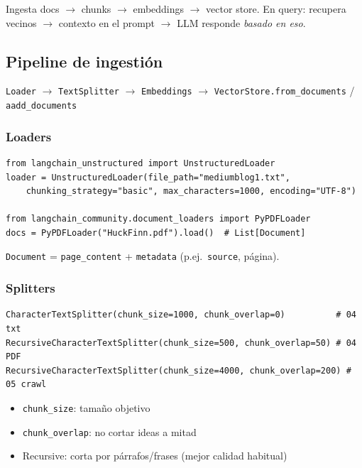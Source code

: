 \documentclass[11pt,a4paper]{article}
\begin{document}
\begin{concept}[title=Idea]
Ingesta docs $\to$ chunks $\to$ embeddings $\to$ vector store.
En query: recupera vecinos $\to$ contexto en el prompt $\to$ LLM responde \emph{basado en eso}.
\end{concept}

\subsection{Pipeline de ingestión}
\begin{center}
\texttt{Loader} $\to$ \texttt{TextSplitter} $\to$ \texttt{Embeddings} $\to$ \texttt{VectorStore.from\_documents} / \texttt{aadd\_documents}
\end{center}

\subsubsection{Loaders}
\begin{lstlisting}
from langchain_unstructured import UnstructuredLoader
loader = UnstructuredLoader(file_path="mediumblog1.txt",
    chunking_strategy="basic", max_characters=1000, encoding="UTF-8")

from langchain_community.document_loaders import PyPDFLoader
docs = PyPDFLoader("HuckFinn.pdf").load()  # List[Document]
\end{lstlisting}

\texttt{Document} = \texttt{page\_content} + \texttt{metadata} (p.ej.\ \texttt{source}, página).

\subsubsection{Splitters}
\begin{lstlisting}
CharacterTextSplitter(chunk_size=1000, chunk_overlap=0)          # 04 txt
RecursiveCharacterTextSplitter(chunk_size=500, chunk_overlap=50) # 04 PDF
RecursiveCharacterTextSplitter(chunk_size=4000, chunk_overlap=200) # 05 crawl
\end{lstlisting}

\begin{itemize}[leftmargin=*,itemsep=1pt]
  \item \texttt{chunk\_size}: tamaño objetivo
  \item \texttt{chunk\_overlap}: no cortar ideas a mitad
  \item Recursive: corta por párrafos/frases (mejor calidad habitual)
\end{itemize}
\end{document}
